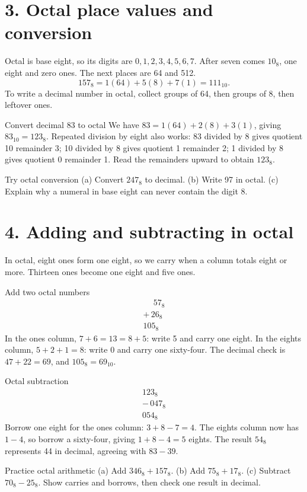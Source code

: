 \documentclass[10pt]{article}
\newcommand{\sect}[1]{\medskip\section*{\color{olive}#1}\vspace{-5pt}}
\begin{document}
\sect{3. Octal place values and conversion}
Octal is base eight, so its digits are $0,1,2,3,4,5,6,7$. After seven comes $10_8$, one eight and zero ones. The next places are 64 and 512.
\[
157_8=1(64)+5(8)+7(1)=111_{10}.
\]
To write a decimal number in octal, collect groups of 64, then groups of 8, then leftover ones.

\begin{worked}{Convert decimal 83 to octal}
We have $83=1(64)+2(8)+3(1)$, giving $83_{10}=123_8$. Repeated division by eight also works: 83 divided by 8 gives quotient 10 remainder 3; 10 divided by 8 gives quotient 1 remainder 2; 1 divided by 8 gives quotient 0 remainder 1. Read the remainders upward to obtain $123_8$.
\end{worked}
\begin{taskbox}{Try octal conversion}
(a) Convert $247_8$ to decimal. (b) Write 97 in octal. (c) Explain why a numeral in base eight can never contain the digit 8.
\end{taskbox}

\sect{4. Adding and subtracting in octal}
In octal, eight ones form one eight, so we carry when a column totals eight or more. Thirteen ones become one eight and five ones.

\begin{worked}{Add two octal numbers}
\[
\begin{array}{r}
\phantom{+}57_8\\[-2pt]
+\,26_8\\ \hline
105_8
\end{array}
\]
In the ones column, $7+6=13=8+5$: write 5 and carry one eight. In the eights column, $5+2+1=8$: write 0 and carry one sixty-four. The decimal check is $47+22=69$, and $105_8=69_{10}$.
\end{worked}
\begin{worked}{Octal subtraction}
\[
\begin{array}{r}
123_8\\[-2pt]
-\,047_8\\ \hline
054_8
\end{array}
\]
Borrow one eight for the ones column: $3+8-7=4$. The eights column now has $1-4$, so borrow a sixty-four, giving $1+8-4=5$ eights. The result $54_8$ represents 44 in decimal, agreeing with $83-39$.
\end{worked}
\begin{taskbox}{Practice octal arithmetic}
(a) Add $346_8+157_8$. (b) Add $75_8+17_8$. (c) Subtract $70_8-25_8$. Show carries and borrows, then check one result in decimal.
\end{taskbox}
\end{document}
